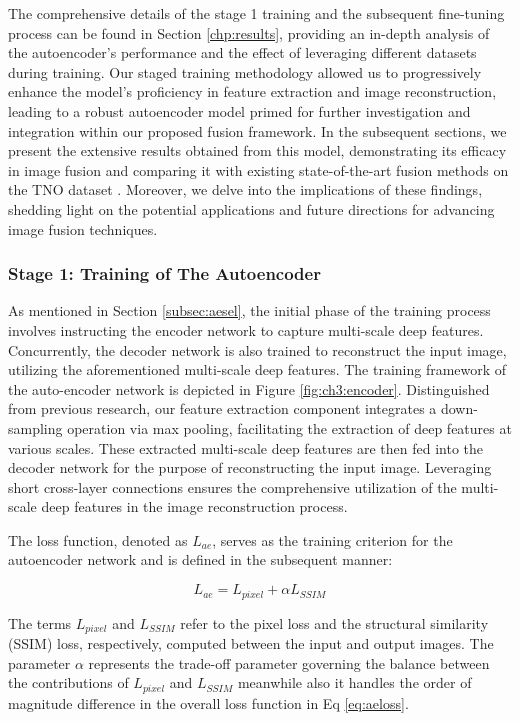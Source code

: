 The comprehensive details of the stage 1 training and the subsequent fine-tuning process can be found in Section \ref{chp:results}, providing an in-depth analysis of the autoencoder's performance and the effect of leveraging different datasets during training. Our staged training methodology allowed us to progressively enhance the model's proficiency in feature extraction and image reconstruction, leading to a robust autoencoder model primed for further investigation and integration within our proposed fusion framework. In the subsequent sections, we present the extensive results obtained from this model, demonstrating its efficacy in image fusion and comparing it with existing state-of-the-art fusion methods on the TNO dataset \cite{toet2014tno}. Moreover, we delve into the implications of these findings, shedding light on the potential applications and future directions for advancing image fusion techniques. 

\subsubsection{Stage 1: Training of The Autoencoder} \label{subsec:aeloss}
As mentioned in Section \ref{subsec:aesel}, the initial phase of the training process involves instructing the encoder network to capture multi-scale deep features. Concurrently, the decoder network is also trained to reconstruct the input image, utilizing the aforementioned multi-scale deep features. The training framework of the auto-encoder network is depicted in Figure \ref{fig:ch3:encoder}. Distinguished from previous research, our feature extraction component integrates a down-sampling operation via max pooling, facilitating the extraction of deep features at various scales. These extracted multi-scale deep features are then fed into the decoder network for the purpose of reconstructing the input image. Leveraging short cross-layer connections ensures the comprehensive utilization of the multi-scale deep features in the image reconstruction process.

The loss function, denoted as $L_{ae}$, serves as the training criterion for the autoencoder network and is defined in the subsequent manner:

\begin{equation}\label{eq:aeloss}
    L_{ae} = L_{pixel} + \alpha  L_{SSIM}
\end{equation}

The terms $L_{pixel}$ and $L_{SSIM}$ refer to the pixel loss and the structural similarity (SSIM) loss, respectively, computed between the input and output images. The parameter $\alpha$ represents the trade-off parameter governing the balance between the contributions of $L_{pixel}$ and $L_{SSIM}$ meanwhile also it handles the order of magnitude difference in the overall loss function in Eq \ref{eq:aeloss}. 

